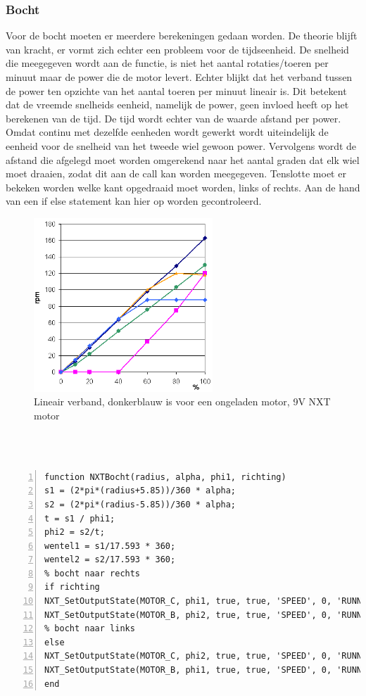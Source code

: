 \documentclass[a4paper]{article}
\begin{document}
\subsubsection{Bocht}
Voor de bocht moeten er meerdere berekeningen gedaan worden. De theorie blijft van kracht, er vormt zich echter een probleem voor de tijdseenheid. De snelheid die meegegeven wordt aan de functie, is niet het aantal rotaties/toeren per minuut maar de power die de motor levert. Echter blijkt dat het verband tussen de power ten opzichte van het aantal toeren per minuut lineair is. Dit betekent dat de vreemde snelheids eenheid, namelijk de power, geen invloed heeft op het berekenen van de tijd. De tijd wordt echter van de waarde afstand per power. Omdat continu met dezelfde eenheden wordt gewerkt wordt uiteindelijk de eenheid voor de snelheid van het tweede wiel gewoon power. Vervolgens wordt de afstand die afgelegd moet worden omgerekend naar het aantal graden dat elk wiel moet draaien, zodat dit aan de call kan worden meegegeven. Tenslotte moet er bekeken worden welke kant opgedraaid moet worden, links of rechts. Aan de hand van een if else statement kan hier op worden gecontroleerd.
\begin{figure}[h]
	\centering
	\includegraphics[width=0.6\textwidth]{imgs/lineair.png}
	\caption{Lineair verband, donkerblauw is voor een ongeladen motor, 9V NXT motor\protect\footnotemark}
	\label{fig:lineairverband}
\end{figure}
\\\\
\vspace{5cm}
\begin{lstlisting}[caption=Bocht, label=lst:bocht, numbers=left]
function NXTBocht(radius, alpha, phi1, richting)
s1 = (2*pi*(radius+5.85))/360 * alpha;
s2 = (2*pi*(radius-5.85))/360 * alpha;
t = s1 / phi1;
phi2 = s2/t;
wentel1 = s1/17.593 * 360;
wentel2 = s2/17.593 * 360;
% bocht naar rechts
if richting
NXT_SetOutputState(MOTOR_C, phi1, true, true, 'SPEED', 0, 'RUNNING', wentel1, 'dontreply');
NXT_SetOutputState(MOTOR_B, phi2, true, true, 'SPEED', 0, 'RUNNING', wentel2, 'dontreply');
% bocht naar links
else
NXT_SetOutputState(MOTOR_C, phi2, true, true, 'SPEED', 0, 'RUNNING', wentel2, 'dontreply');
NXT_SetOutputState(MOTOR_B, phi1, true, true, 'SPEED', 0, 'RUNNING', wentel1, 'dontreply');
end
\end{lstlisting}
\end{document}
